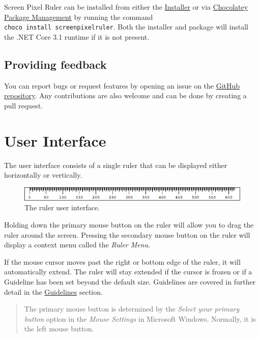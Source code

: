 \documentclass[
]{book}
\begin{document}
Screen Pixel Ruler can be installed from either the \href{https://github.com/Cossey/ScreenPixelRuler2/releases}{Installer} or via \href{https://chocolatey.org}{Chocolatey Package Management} by running the command \texttt{choco\ install\ screenpixelruler}.
Both the installer and package will install the .NET Core 3.1 runtime if it is not present.

\hypertarget{providing-feedback}{%
\section{Providing feedback}\label{providing-feedback}}

You can report bugs or request features by opening an issue on the \href{https://github.com/Cossey/ScreenPixelRuler2}{GitHub repository}.
Any contributions are also welcome and can be done by creating a pull request.

\hypertarget{ui}{%
\chapter{User Interface}\label{ui}}

The user interface consists of a single ruler that can be displayed either horizontally or vertically.

\begin{figure}
\centering
\includegraphics{images/ruler.png}
\caption{\label{fig:unnamed-chunk-1}The ruler user interface.}
\end{figure}

Holding down the primary mouse button on the ruler will allow you to drag the ruler around the screen.
Pressing the secondary mouse button on the ruler will display a context menu called the \emph{Ruler Menu}.

If the mouse cursor moves past the right or bottom edge of the ruler, it will automatically extend.
The ruler will stay extended if the cursor is frozen or if a Guideline has been set beyond the default size.
Guidelines are covered in further detail in the \protect\hyperlink{guidelines}{Guidelines} section.

\begin{quote}
The primary mouse button is determined by the \emph{Select your primary button} option in the \emph{Mouse Settings} in Microsoft Windows.
Normally, it is the left mouse button.
\end{quote}
\end{document}
